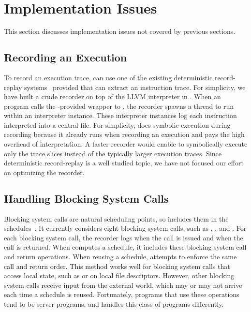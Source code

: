 \section{Implementation Issues} \label{sec:peregrine-impl}

This section discusses implementation issues not covered by previous sections.

\subsection{Recording an Execution} \label{sec:peregrine-record}

To record an execution trace, \peregrine can use one of the existing
deterministic record-replay
systems~\cite{scribe:sigmetrics10,smp-revirt:vee08,idna:vee06} provided
that \peregrine can extract an instruction trace.  For simplicity, we have built
a crude recorder on top of the LLVM interpreter in \klee.  When an program
calls the \peregrine-provided wrapper to ,
the recorder spawns a thread to run 
within an interpreter instance.  These interpreter instances log
each instruction interpreted into a central file.
For simplicity, \peregrine does symbolic execution during recording because it
already runs \klee when recording an execution and pays the high overhead
of interpretation.  A faster recorder would enable \peregrine to
symbolically execute only the trace slices instead of the typically larger
execution traces.  Since deterministic record-replay is a well
studied topic, we have not focused our effort on optimizing the recorder.


\subsection{Handling Blocking System Calls}

Blocking system calls are natural scheduling points, so \peregrine includes them
in the schedules~\cite{cui:tern:osdi10}.  It currently considers eight
blocking system calls, such as ,
, and .  For each blocking system call, the recorder
logs when the call is issued and when the call is returned.  When \peregrine
computes a schedule, it includes these blocking system call and return
operations.  When reusing a schedule, \peregrine attempts to enforce the same
call and return order.  This method works well for blocking system calls
that access local state, such as  or  on local file
descriptors.  However, other blocking system calls receive input from
the external world, which may or may not arrive each time a
schedule is reused.  Fortunately, programs that use these operations tend to be
server programs, and \peregrine handles this class of programs differently.

